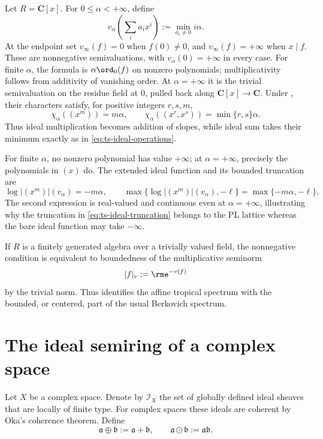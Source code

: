 \begin{example}
\label{ex:ts-affine-line-family}
Let $R=\mathbf C[x]$.  For $0\leq\alpha<+\infty$, define
\[
 v_\alpha\!\left(\sum_i a_ix^i\right)
       :=\min_{a_i\ne0}i\alpha.
\]
At the endpoint set $v_\infty(f)=0$ when $f(0)\ne0$, and
$v_\infty(f)=+\infty$ when $x\mid f$.  These are nonnegative
semivaluations, with $v_\alpha(0)=+\infty$ in every case. For
finite $\alpha$, the formula is $\alpha\ord_0(f)$ on nonzero
polynomials; multiplicativity follows from additivity of vanishing order.
At $\alpha=+\infty$ it is the trivial semivaluation on the residue
field at $0$, pulled back along $\mathbf C[x]\to\mathbf C$.
Under , their characters
satisfy, for positive integers $r,s,m$,
\[
 \chi_\alpha((x^m))=m\alpha,
 \qquad
 \chi_\alpha((x^r,x^s))=\min\{r,s\}\alpha.
\]
Thus ideal multiplication becomes addition of slopes, while ideal sum takes
their minimum exactly as in \eqref{eq:ts-ideal-operations}.

For finite $\alpha$, no nonzero polynomial has value $+\infty$; at
$\alpha=+\infty$, precisely the polynomials in $(x)$ do.  The extended
ideal function and its bounded truncation are
\[
       \log|(x^m)|(v_\alpha)=-m\alpha,
       \qquad
       \max\{\log|(x^m)|(v_\alpha),-\ell\}
          =\max\{-m\alpha,-\ell\}.
\]
The second expression is real-valued and continuous even at
$\alpha=+\infty$, illustrating why the truncation in
\eqref{eq:ts-ideal-truncation} belongs to the PL lattice whereas the bare
ideal function may take $-\infty$.
\end{example}

If $R$ is a finitely generated algebra over a trivially valued field, the
nonnegative condition is equivalent to boundedness of the multiplicative
seminorm
\[
                              |f|_v:=\rme^{-v(f)}
\]
by the trivial norm.
Thus  identifies the affine tropical
spectrum with the bounded, or centered, part of the usual Berkovich
spectrum.

\section{The ideal semiring of a complex space}
\label{sec:ts-sheaves}

Let $X$ be a complex space.
Denote by $\mathscr I_X$ the set of globally defined ideal sheaves that
are locally of finite type.
For complex spaces these ideals are coherent by Oka's coherence theorem.
Define
\[
             \mathfrak a\oplus\mathfrak b
                   :=\mathfrak a+\mathfrak b,
 \qquad
             \mathfrak a\odot\mathfrak b
                   :=\mathfrak a\mathfrak b.
\tag{58.7}\label{eq:ts-sheaf-semiring}
\]

